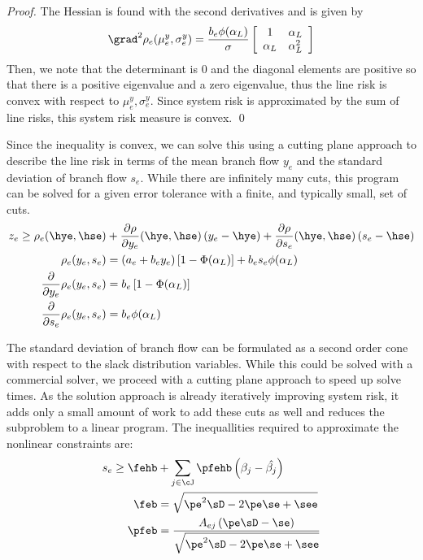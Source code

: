 \begin{proof}
The Hessian is found with the second derivatives and is given by
\begin{equation}
\grad^2 \rho_e(\mu^y_e,\sigma^y_e) = \frac{b_e \phi(\alpha_L)}{\sigma}
\left[ 
\begin{array}{c c}
1 & \alpha_L \\
\alpha_L & \alpha_L^2
\end{array}
\right]
\end{equation}
Then, we note that the determinant is 0 and the diagonal elements are positive so that there is a positive eigenvalue and a zero eigenvalue, thus the line risk is convex with respect to $\mu^y_e, \sigma^y_e$.  Since system risk is approximated by the sum of line risks, this system risk measure is convex. \qed
\end{proof}

 Since the inequality  is convex, we can solve this using a cutting plane approach to describe the line risk in terms of the mean branch flow $y_e$ and the standard deviation of branch flow $s_e$.  While there are infinitely many cuts, this program can be solved for a given error tolerance with a finite, and typically small, set of cuts.
\begin{subequations}
\label{line_risk_cuts}
\begin{align}
z_e \geq \rho_e(\hye,\hse) &+ \frac{\partial \rho}{\partial y_e}(\hye,\hse) \left(y_e - \hye \right) 
+ \frac{\partial \rho}{\partial s_e}(\hye,\hse) \left(s_e - \hse \right) \\
\rho_e(y_e,s_e) &= (a_e + b_e y_e)\left[ 1 - \Phi(\alpha_L) \right]  + b_e s_e \phi(\alpha_L)  \\
 \frac{\partial}{\partial y_e}\rho_e(y_e,s_e) &= b_e\left[ 1 - \Phi(\alpha_L) \right]\\
\frac{\partial}{\partial s_e}\rho_e(y_e,s_e) &= b_e \phi(\alpha_L) 
\end{align}
\end{subequations}

The standard deviation of branch flow can be formulated as a second order cone with respect to the slack distribution variables.  While this could be solved with a commercial solver, we proceed with a cutting plane approach to speed up solve times.  As the solution approach is already iteratively improving system risk, it adds only a small amount of work to add these cuts as well and reduces the subproblem to a linear program.  The inequallities required to approximate the nonlinear constraints  are:
\begin{subequations}
\label{branch_var_cuts}
\begin{align}
s_e \geq \fehb &+ \sum_{j \in \cJ} \pfehb \left( \beta_j - \hat{\beta_j} \right)\\
  \feb &= \sqrt{\pe^2 \sD - 2 \pe \se  + \see }\\
  \pfeb &= \frac{A_{ej} \left( \pe \sD - \se \right)}{\sqrt{\pe^2 \sD - 2 \pe \se  + \see }}
\end{align}
\end{subequations}




